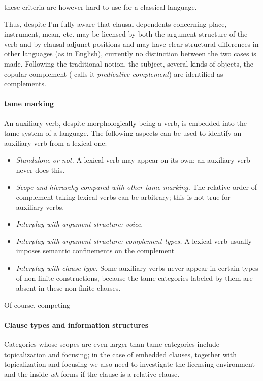 \documentclass[a4paper, oneside, 12pt]{report}
\newcommand*{\term}[1]{\emph{#1}}
\newcommand{\form}[1]{\emph{#1}}
\begin{document}
these criteria are however hard to use for a classical language. 

Thus, despite I'm fully aware that  
clausal dependents concerning place, instrument, mean, etc. 
may be licensed by both the argument structure of the verb 
and by clausal adjunct positions 
and may have clear structural differences in other languages 
(as in English), 
currently no distinction between the two cases is made.
Following the traditional notion,
the subject, several kinds of objects,
the copular complement (\cite{cgel} calls it \term{predicative complement}) 
are identified as complements.


\paragraph*{\ac{tame} marking} 

An auxiliary verb, despite morphologically being a verb, 
is embedded into the \ac{tame} system of a language.
The following aspects can be used to identify 
an auxiliary verb from a lexical one:
\begin{itemize}
    \item \emph{Standalone or not.} A lexical verb may appear on its own;
    an auxiliary verb never does this.
    \item \emph{Scope and hierarchy compared with other \ac{tame} marking.} 
    The relative order of complement-taking lexical verbs can be arbitrary;
    this is not true for auxiliary verbs. 
    \item \emph{Interplay with argument structure: voice}.
    \item \emph{Interplay with argument structure: complement types.} 
    A lexical verb usually imposes semantic confinements on the complement 
    \item \emph{Interplay with clause type.} 
    Some auxiliary verbs never appear in certain types of non-finite constructions, 
    because the \ac{tame} categories labeled by them 
    are absent in these non-finite clauses.
\end{itemize}
Of course, competing  

\paragraph*{Clause types and information structures} Categories whose scopes are even larger than \ac{tame} categories include topicalization and focusing;
in the case of embedded clauses, 
together with topicalization and focusing 
we also need to investigate the licensing environment
and the inside \form{wh}-forms if the clause is a relative clause.
\end{document}
